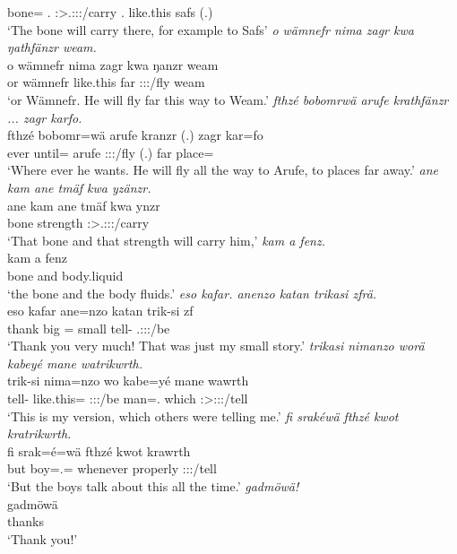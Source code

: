 \begin{exe}
	bone={\Erg} \Third.{\Abs} {\Dem} {\Fut} \Stsg:\Sbj>\Tsg.\Masc:\Obj:\Nonpast:\Ipfv/carry \Med.{\All} like.this safs (.)\\
	\trans `The bone will carry there, for example to Safs'
	\emph{o wämnefr nima zagr kwa ŋathfänzr weam.}\\
	\gll o wämnefr nima zagr kwa ŋanzr weam\\
	or wämnefr like.this far {\Fut} \Stsg:\Sbj:\Nonpast:\Ipfv/fly weam\\
	\trans `or Wämnefr. He will fly far this way to Weam.'
	\emph{fthzé bobomrwä arufe krathfänzr ... zagr karfo.}\\
	\gll fthzé bobomr=wä arufe kranzr (.) zagr kar=fo\\
	ever until={\Emph} arufe \Stsg:\Sbj:\Irr:\Ipfv/fly (.) far place=\Loc\\
	\trans `Where ever he wants. He will fly all the way to Arufe, to places far away.'
	\emph{ane kam ane tmäf kwa yzänzr.}\\
	\gll ane kam ane tmäf kwa ynzr\\
	{\Dem} bone {\Dem} strength {\Fut} \Stsg:\Sbj>\Tsg.\Masc:\Obj:\Nonpast:\Ipfv/carry\\
	\trans `That bone and that strength will carry him,'
	\emph{kam a fenz.}\\
	\gll kam a fenz\\
	bone and body.liquid\\
	\trans `the bone and the body fluids.'
	\emph{eso kafar. anenzo katan trikasi zfrä.}\\
	\gll eso kafar ane=nzo katan trik-si zf\\
	thank big \Dem={\Only} small tell-{\Nmlz} \Tsg.\F:\Sbj:\Rpst:\Ipfv/be\\
	\trans `Thank you very much! That was just my small story.'
	\emph{trikasi nimanzo worä kabeyé mane watrikwrth.}\\
	\gll trik-si nima=nzo wo kabe=yé mane wawrth\\
	tell-{\Nmlz} like.this={\Only} \Fsg:\Sbj:\Nonpast:\Ipfv/be man=\Erg.{\Nsg} which \Stpl:\Sbj>\Fsg:\Io:\Nonpast:\Ipfv/tell\\
	\trans `This is my version, which others were telling me.'
	\emph{fi srakéwä fthzé kwot kratrikwrth.}\\
	\gll fi srak=é=wä fthzé kwot krawrth\\
	but boy=\Erg.\Nsg={\Emph} whenever properly \Stpl:\Sbj:\Irr:\Ipfv/tell\\
	\trans `But the boys talk about this all the time.'
	\emph{gadmöwä!}\\
	\gll gadmöwä\\
	thanks\\
	\trans `Thank you!'
\end{exe}%